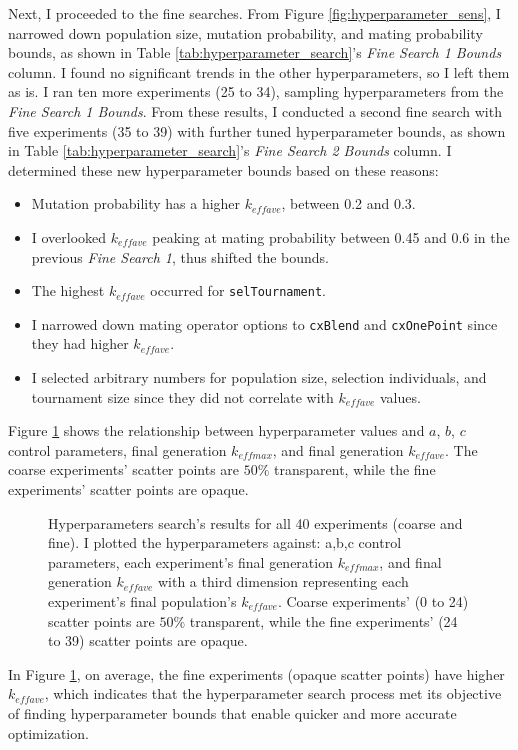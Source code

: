 Next, I proceeded to the fine searches. 
From Figure \ref{fig:hyperparameter_sens}, I narrowed down population size, 
mutation probability, and mating probability bounds, as shown in Table 
\ref{tab:hyperparameter_search}'s \textit{Fine Search 1 Bounds} column. 
I found no significant trends in the other hyperparameters, so I left them 
as is. 
I ran ten more experiments (25 to 34), sampling hyperparameters from 
the \textit{Fine Search 1 Bounds}. 
From these results, I conducted a second fine search with five experiments 
(35 to 39) with further tuned hyperparameter bounds, as shown in Table 
\ref{tab:hyperparameter_search}'s \textit{Fine Search 2 Bounds} column. 
I determined these new hyperparameter bounds based on these reasons: 
\begin{itemize}
    \item Mutation probability has a higher $k_{eff ave}$, between 0.2 and 0.3.
    \item I overlooked $k_{eff ave}$  peaking at mating probability between 
    0.45 and 0.6 in the previous \textit{Fine Search 1}, thus shifted the bounds. 
    \item The highest $k_{eff ave}$ occurred for \texttt{selTournament}. 
    \item I narrowed down mating operator options to \texttt{cxBlend} and 
    \texttt{cxOnePoint} since they had higher $k_{eff ave}$. 
    \item I selected arbitrary numbers for population size, 
    selection individuals, and tournament size since they did not 
    correlate with $k_{eff ave}$ values. 
\end{itemize}
Figure \ref{fig:input_hyperparameters_sens} shows the relationship between 
hyperparameter values and $a$, $b$, $c$ control parameters, final generation 
$k_{eff max}$, and final generation $k_{eff ave}$. 
The coarse experiments' scatter points are $50\%$ transparent, while the fine 
experiments' scatter points are opaque. 
\begin{figure}[]
    \centering
    \caption{Hyperparameters search's results for all 40 experiments (coarse 
    and fine). I plotted the hyperparameters against: a,b,c control parameters, 
    each experiment's final generation $k_{eff max}$, and final generation 
    $k_{eff ave}$ with a third dimension representing each experiment's final 
    population's $k_{eff ave}$. Coarse experiments' (0 to 24) scatter points 
    are $50\%$ transparent, while the fine experiments' (24 to 39) scatter points 
    are opaque. }
    \label{fig:input_hyperparameters_sens}
\end{figure}
In Figure \ref{fig:input_hyperparameters_sens}, on average, the fine experiments 
(opaque scatter points) have higher $k_{eff ave}$, which indicates that the
hyperparameter search process met its objective of finding hyperparameter 
bounds that enable quicker and more accurate optimization. 

